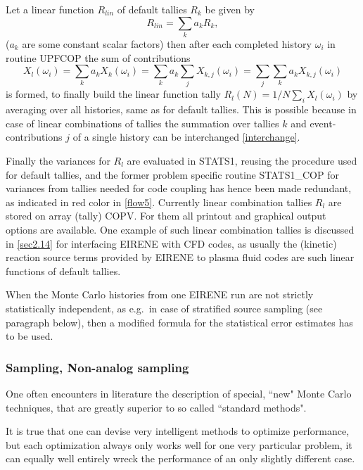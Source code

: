 Let a linear function $R_{lin}$  of default tallies $R_k$ be given by
\begin{equation}
  R_{lin} = \sum_k a_k R_k,
\end{equation}
($a_k$ are some
constant scalar factors) then after each completed history $\omega_i$ in
routine UPFCOP the sum of contributions
\begin{equation}
  \label{interchange}
  X_l(\omega_i)= \sum_k a_k X_k(\omega_i) = \sum_k a_k \sum_j X_{k,j}(\omega_i) =
  \sum_j \sum_k a_k X_{k,j}(\omega_i)
\end{equation}
is formed, to finally build
the linear function tally $R_l(N)=1/N\sum_i X_l(\omega_i)$ by averaging over
all histories, same as for default tallies.
This is possible because in case of linear combinations of tallies the
summation over tallies $k$ and event-contributions $j$ of a single history can
be interchanged \cref{interchange}.

Finally the variances for $R_l$ are evaluated in STATS1, reusing the procedure
used for default tallies, and the former problem specific routine STATS1\_COP
for variances from tallies needed for code coupling has hence been made
redundant, as indicated in red color in \cref{flow5}.
Currently linear combination tallies $R_l$ are stored on array (tally) COPV.
For them all printout and graphical output options are available.
One example of such linear combination tallies is discussed in \cref{sec2.14}
for interfacing EIRENE with \ac{CFD} codes, as usually the (kinetic) reaction
source terms provided by EIRENE to plasma fluid codes are such linear functions
of default tallies.


When the Monte Carlo histories from one EIRENE run are not strictly
statistically independent, as e.g.\ in case of stratified source sampling (see
paragraph below), then a modified formula for the statistical error estimates
has to be used.

\subsubsection{Sampling, Non-analog sampling}
\label{sec1.2.1a}

One often encounters in literature the description of special, ``new" Monte
Carlo techniques, that are greatly superior to so called ``standard methods".

It is true that one can devise very intelligent methods to optimize
performance, but each optimization always only works well for one very
particular problem, it can equally well entirely wreck the performance of an
only  slightly different case.

